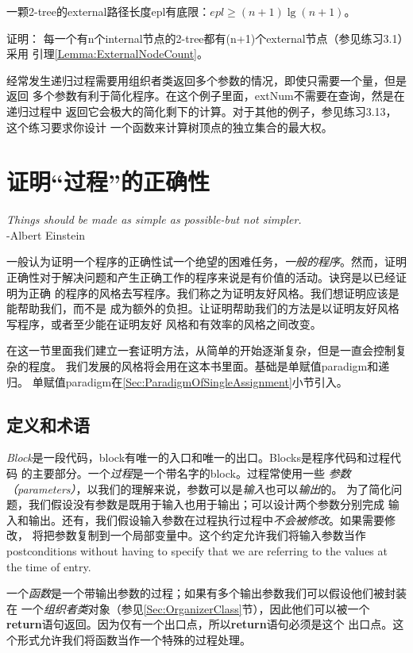 \begin{corollary}
一颗2-tree的external路径长度epl有底限：$epl \geq (n+1)\lg(n+1)$。

证明： 每一个有n个internal节点的2-tree都有(n+1)个external节点（参见练习3.1）采用
引理\ref{Lemma:ExternalNodeCount}。
\end{corollary}

经常发生递归过程需要用组织者类返回多个参数的情况，即使只需要一个量，但是返回
多个参数有利于简化程序。在这个例子里面，extNum不需要在查询，然是在递归过程中
返回它会极大的简化剩下的计算。对于其他的例子，参见练习3.13，这个练习要求你设计
一个函数来计算树顶点的独立集合的最大权。

\section{证明“过程”的正确性}\label{Sec:ProvingCorrectnessOfProcedures}
\emph{Things should be made as simple as possible-but not simpler.}\\
\indent\indent -Albert Einstein

一般认为证明一个程序的正确性试一个绝望的困难任务，\emph{一般的程序}。然而，证明
正确性对于解决问题和产生正确工作的程序来说是有价值的活动。诀窍是以已经证明为正确
的程序的风格去写程序。我们称之为证明友好风格。我们想证明应该是能帮助我们，而不是
成为额外的负担。让证明帮助我们的方法是以证明友好风格写程序，或者至少能在证明友好
风格和有效率的风格之间改变。

在这一节里面我们建立一套证明方法，从简单的开始逐渐复杂，但是一直会控制复杂的程度。
我们发展的风格将会用在这本书里面。基础是单赋值paradigm和递归。
单赋值paradigm在\ref{Sec:ParadigmOfSingleAssignment}小节引入。

\subsection{定义和术语}
\emph{Block}是一段代码，block有唯一的入口和唯一的出口。Blocks是程序代码和过程代码
的主要部分。一个\emph{过程}是一个带名字的block。过程常使用一些
\emph{参数（parameters）}，以我们的理解来说，参数可以是\emph{输入}也可以\emph{输出}的。
为了简化问题，我们假设没有参数是既用于输入也用于输出；可以设计两个参数分别完成
输入和输出。还有，我们假设输入参数在过程执行过程中\emph{不会被修改}。如果需要修改，
将把参数复制到一个局部变量中。这个约定允许我们将输入参数当作postconditions without
 having to specify that we are referring to the values at the time of entry.

一个\emph{函数}是一个带输出参数的过程；如果有多个输出参数我们可以假设他们被封装在
一个\emph{组织者类}对象（参见\ref{Sec:OrganizerClass}节），因此他们可以被一个
\textbf{return}语句返回。因为仅有一个出口点，所以\textbf{return}语句必须是这个
出口点。这个形式允许我们将函数当作一个特殊的过程处理。

